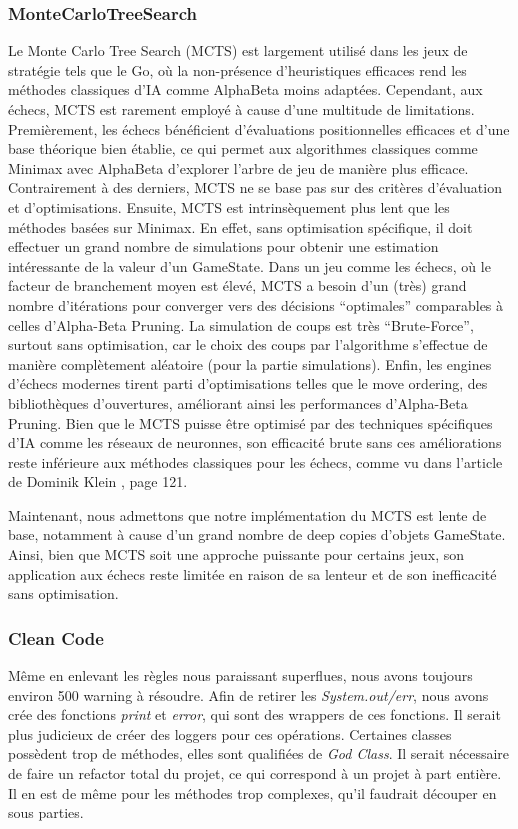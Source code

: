 \documentclass{article}
\begin{document}
\subsubsection{MonteCarloTreeSearch}
Le Monte Carlo Tree Search (MCTS) est largement utilisé dans les jeux de stratégie tels que le Go, où la non-présence d'heuristiques efficaces rend les méthodes classiques d'IA comme
AlphaBeta moins adaptées. Cependant, aux échecs, MCTS est rarement employé à cause d'une multitude de limitations.
Premièrement, les échecs bénéficient d'évaluations positionnelles efficaces et d'une base théorique bien établie, ce qui permet aux algorithmes classiques 
comme Minimax avec AlphaBeta d'explorer l'arbre de jeu de manière plus efficace. Contrairement à des derniers, MCTS ne se base pas sur des critères 
d'évaluation et d'optimisations. Ensuite, MCTS est intrinsèquement plus lent que les méthodes basées sur Minimax. En effet, sans optimisation spécifique, 
il doit effectuer un grand nombre de simulations pour obtenir une estimation intéressante de la valeur d'un GameState. Dans un jeu comme les échecs, où le 
facteur de branchement moyen est élevé, MCTS a besoin d'un (très) grand nombre d'itérations pour converger vers des décisions ``optimales'' comparables à 
celles d'Alpha-Beta Pruning. La simulation de coups est très ``Brute-Force'', surtout sans optimisation, car le choix des coups par l'algorithme s'effectue 
de manière complètement aléatoire (pour la partie simulations).
Enfin, les engines d'échecs modernes tirent parti d'optimisations telles que le move ordering, des bibliothèques d'ouvertures, améliorant ainsi les 
performances d'Alpha-Beta Pruning. Bien que le MCTS puisse être optimisé par des techniques spécifiques d'IA comme les réseaux de neuronnes, son 
efficacité brute sans ces améliorations reste inférieure aux méthodes classiques pour les échecs, comme vu dans l'article de Dominik Klein \cite{NNChess}, 
page 121. 

Maintenant, nous admettons que notre implémentation du MCTS est
lente de base, notamment à cause d'un grand nombre de deep copies d'objets GameState.
Ainsi, bien que MCTS soit une approche puissante pour certains jeux, son application aux échecs reste limitée en raison de sa lenteur et de son inefficacité 
sans optimisation.

\subsubsection{Clean Code}
Même en enlevant les règles nous paraissant superflues, nous avons toujours environ 500 warning à résoudre.
Afin de retirer les \textit{System.out/err}, nous avons crée des fonctions \textit{print} et \textit{error}, qui sont des wrappers de ces fonctions. Il serait plus judicieux de créer
des loggers pour ces opérations.
Certaines classes possèdent trop de méthodes, elles sont qualifiées de \textit{God Class}. Il serait nécessaire de faire un refactor total du projet, ce qui correspond à un projet à part entière.
Il en est de même pour les méthodes trop complexes, qu'il faudrait découper en sous parties.
\end{document}
